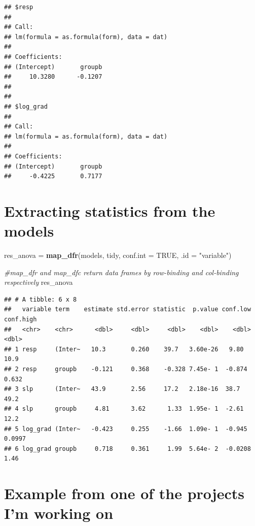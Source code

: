 \documentclass[]{article}
\newenvironment{Shaded}{\begin{snugshade}}{\end{snugshade}}
\newcommand{\KeywordTok}[1]{\textcolor[rgb]{0.13,0.29,0.53}{\textbf{#1}}}
\newcommand{\DataTypeTok}[1]{\textcolor[rgb]{0.13,0.29,0.53}{#1}}
\newcommand{\StringTok}[1]{\textcolor[rgb]{0.31,0.60,0.02}{#1}}
\newcommand{\CommentTok}[1]{\textcolor[rgb]{0.56,0.35,0.01}{\textit{#1}}}
\newcommand{\OtherTok}[1]{\textcolor[rgb]{0.56,0.35,0.01}{#1}}
\newcommand{\OperatorTok}[1]{\textcolor[rgb]{0.81,0.36,0.00}{\textbf{#1}}}
\newcommand{\NormalTok}[1]{#1}
\begin{document}
\begin{Shaded}
\end{Shaded}

\begin{verbatim}
## $resp
## 
## Call:
## lm(formula = as.formula(form), data = dat)
## 
## Coefficients:
## (Intercept)       groupb  
##     10.3280      -0.1207  
## 
## 
## $log_grad
## 
## Call:
## lm(formula = as.formula(form), data = dat)
## 
## Coefficients:
## (Intercept)       groupb  
##     -0.4225       0.7177
\end{verbatim}

\section{Extracting statistics from the
models}\label{extracting-statistics-from-the-models}

\begin{Shaded}
\begin{Highlighting}[]
\NormalTok{res_anova =}\StringTok{ }\KeywordTok{map_dfr}\NormalTok{(models, tidy, }\DataTypeTok{conf.int =} \OtherTok{TRUE}\NormalTok{, }\DataTypeTok{.id =} \StringTok{"variable"}\NormalTok{) }

\CommentTok{#map_dfr and map_dfc return data frames by row-binding and col-binding respectively}
\NormalTok{res_anova}
\end{Highlighting}
\end{Shaded}

\begin{verbatim}
## # A tibble: 6 x 8
##   variable term    estimate std.error statistic  p.value conf.low conf.high
##   <chr>    <chr>      <dbl>     <dbl>     <dbl>    <dbl>    <dbl>     <dbl>
## 1 resp     (Inter~   10.3       0.260    39.7   3.60e-26   9.80     10.9   
## 2 resp     groupb    -0.121     0.368    -0.328 7.45e- 1  -0.874     0.632 
## 3 slp      (Inter~   43.9       2.56     17.2   2.18e-16  38.7      49.2   
## 4 slp      groupb     4.81      3.62      1.33  1.95e- 1  -2.61     12.2   
## 5 log_grad (Inter~   -0.423     0.255    -1.66  1.09e- 1  -0.945     0.0997
## 6 log_grad groupb     0.718     0.361     1.99  5.64e- 2  -0.0208    1.46
\end{verbatim}

\section{Example from one of the projects I'm working
on}\label{example-from-one-of-the-projects-im-working-on}
\end{document}
